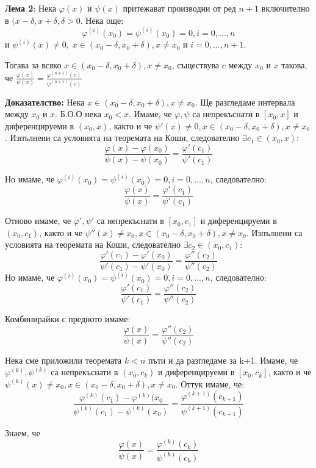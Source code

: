 \documentclass{article}
\renewcommand{\\}{\newline}
\newcommand{\doc}{\textbf{Доказателство: }}
\begin{document}
\textbf{Лема 2}: Нека \(\varphi(x)\) и \(\psi(x)\) притежават производни от ред \(n+1\) включително в \((x-\delta, x+\delta, \delta>0\). Нека още: \[
  \varphi^{(i)}(x_0) = \psi^{(i)}(x_0) = 0, i = 0, ..., n
\]    
и \(\psi^{(i)}(x) \not=0,\; x \in (x_0 - \delta, x_0 + \delta), x\not=x_0\) и \(i = 0,..., n+1\). 

Тогава за всяко \(x \in (x_0 - \delta, x_0 + \delta), x\not=x_0\), съществува \(c\) между \(x_0\) и \(x\) такова, че \(\frac{\varphi(x)}{\psi(x)} = \frac{\varphi^{(n+1)}(c)}{\psi^{(n+1)}(c)}\) 

\doc Нека \(x \in (x_0 - \delta, x_0 + \delta), x\not= x_0\). Ще разгледаме интервала между \(x_0\) и \(x\). Б.О.О нека \(x_0 < x\). Имаме, че  \(\varphi, \psi\) са непрекъснати в \([x_0, x]\) и диференцируеми в \((x_0, x)\), както и че \(\psi'(x) \not=0, x \in (x_0 - \delta, x_0 + \delta), x\not= x_0\). Изпълнени са условията на теоремата на Коши, следователно \(\exists c_1 \in (x_0, x)\):\[
  \frac{\varphi(x) - \varphi(x_0)}{\psi(x) - \psi(x_0)} = \frac{\varphi'(c_1)}{\psi'(c_1)}
\]  

Но имаме, че \(\varphi^{(i)}(x_0) = \psi^{(i)}(x_0) = 0, i = 0, ..., n\), следователно:
\[
 \frac{\varphi(x)}{\psi(x)} = \frac{\varphi'(c_1)}{\psi'(c_1)} 
\] 

Отново имаме, че \(\varphi', \psi'\) са непрекъснати в \([x_0, c_1]\) и диференцируеми в \((x_0, c_1)\), както и че \(\psi''(x) \not = x_0, x \in (x_0 - \delta, x_0 + \delta), x\not= x_0\). Изпълнени са условията на теоремата на Коши, следователно \(\exists c_2 \in (x_0, c_1)\): \[
  \frac{\varphi'(c_1) - \varphi'(x_0)}{\psi'(c_1) - \psi'(x_0)} = \frac{\varphi''(c_2)}{\psi''(c_2)}
\]    
Но имаме, че \(\varphi^{(i)}(x_0) = \psi^{(i)}(x_0) = 0, i = 0, ..., n\), следователно:
\[
  \frac{\varphi'(c_1)}{\psi'(c_1)} = \frac{\varphi''(c_2)}{\psi''(c_2)}
\]    

Комбинирайки с предното имаме: \[
  \frac{\varphi(x)}{\psi(x)} = \frac{\varphi''(c_2)}{\psi''(c_2)}
\] 

Нека сме приложили теоремата \(k < n\) пъти и да разгледаме за k+1. Имаме, че \(\varphi^{(k)}, \psi^{(k)}\) са непрекъснати в \((x_0, c_k)\) и диференцируеми в \([x_0, c_k]\), както и че \(\psi^{(k)}(x) \not = x_0, x \in (x_0 - \delta, x_0 + \delta), x\not= x_0\). Оттук имаме, че:
\[
  \frac{\varphi^{(k)}(c_1) - \varphi^{(k)}(x_0}{\psi^{(k)}(c_1) - \psi^{(k)}(x_0)} = \frac{\varphi^{(k+1)}(c_{k+1})}{\psi^{(k+1)}(c_{k+1})}
\] 

Знаем, че \[
  \frac{\varphi(x)}{\psi(x)} = \frac{\varphi^{(k)}(c_k)}{\psi^{(k)}(c_k)}
\] 
\end{document}
